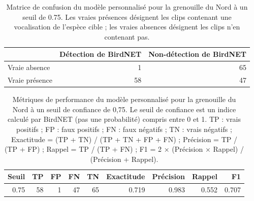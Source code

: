 \begin{table}[H]
\centering
\caption{Matrice de confusion du modèle personnalisé pour la grenouille du Nord à un seuil de 0.75. Les vraies présences désignent les clips contenant une vocalisation de l'espèce cible ; les vraies absences désignent les clips n'en contenant pas.}
\label{tab:tab_confusion_septentrionalis_075}
\begin{tabular}{lrr}
  \hline
 & Détection de BirdNET & Non-détection de BirdNET \\
  \hline
Vraie absence  &  1 & 65 \\
Vraie présence & 58 & 47 \\
  \hline
\end{tabular}
\end{table}

\begin{table}[H]
\centering
\caption{Métriques de performance du modèle personnalisé pour la grenouille du Nord à un seuil de confiance de 0,75. Le seuil de confiance est un indice calculé par BirdNET (pas une probabilité) compris entre 0 et 1. TP : vrais positifs ; FP : faux positifs ; FN : faux négatifs ; TN : vrais négatifs ; Exactitude = (TP + TN) / (TP + TN + FP + FN) ; Précision = TP / (TP + FP) ; Rappel = TP / (TP + FN) ; F1 = 2 × (Précision × Rappel) / (Précision + Rappel).}
\label{tab:tab_metrics_septentrionalis_075}
\begin{tabular}{rrrrrrrrr}
  \hline
Seuil & TP & FP & FN & TN & Exactitude & Précision & Rappel & F1 \\
  \hline
0.75 & 58 & 1 & 47 & 65 & 0.719 & 0.983 & 0.552 & 0.707 \\
  \hline
\end{tabular}
\end{table}


